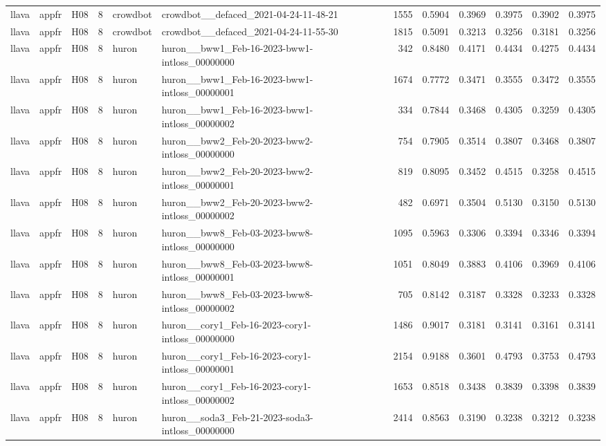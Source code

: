 \begin{table}[tbp]
\begin{tabular}{lllrllrrrrrr}
llava & appfr & H08 & 8 & crowdbot & crowdbot\_\_defaced\_2021-04-24-11-48-21 & 1555 & 0.5904 & 0.3969 & 0.3975 & 0.3902 & 0.3975 \\
llava & appfr & H08 & 8 & crowdbot & crowdbot\_\_defaced\_2021-04-24-11-55-30 & 1815 & 0.5091 & 0.3213 & 0.3256 & 0.3181 & 0.3256 \\
llava & appfr & H08 & 8 & huron & huron\_\_bww1\_Feb-16-2023-bww1-intloss\_00000000 & 342 & 0.8480 & 0.4171 & 0.4434 & 0.4275 & 0.4434 \\
llava & appfr & H08 & 8 & huron & huron\_\_bww1\_Feb-16-2023-bww1-intloss\_00000001 & 1674 & 0.7772 & 0.3471 & 0.3555 & 0.3472 & 0.3555 \\
llava & appfr & H08 & 8 & huron & huron\_\_bww1\_Feb-16-2023-bww1-intloss\_00000002 & 334 & 0.7844 & 0.3468 & 0.4305 & 0.3259 & 0.4305 \\
llava & appfr & H08 & 8 & huron & huron\_\_bww2\_Feb-20-2023-bww2-intloss\_00000000 & 754 & 0.7905 & 0.3514 & 0.3807 & 0.3468 & 0.3807 \\
llava & appfr & H08 & 8 & huron & huron\_\_bww2\_Feb-20-2023-bww2-intloss\_00000001 & 819 & 0.8095 & 0.3452 & 0.4515 & 0.3258 & 0.4515 \\
llava & appfr & H08 & 8 & huron & huron\_\_bww2\_Feb-20-2023-bww2-intloss\_00000002 & 482 & 0.6971 & 0.3504 & 0.5130 & 0.3150 & 0.5130 \\
llava & appfr & H08 & 8 & huron & huron\_\_bww8\_Feb-03-2023-bww8-intloss\_00000000 & 1095 & 0.5963 & 0.3306 & 0.3394 & 0.3346 & 0.3394 \\
llava & appfr & H08 & 8 & huron & huron\_\_bww8\_Feb-03-2023-bww8-intloss\_00000001 & 1051 & 0.8049 & 0.3883 & 0.4106 & 0.3969 & 0.4106 \\
llava & appfr & H08 & 8 & huron & huron\_\_bww8\_Feb-03-2023-bww8-intloss\_00000002 & 705 & 0.8142 & 0.3187 & 0.3328 & 0.3233 & 0.3328 \\
llava & appfr & H08 & 8 & huron & huron\_\_cory1\_Feb-16-2023-cory1-intloss\_00000000 & 1486 & 0.9017 & 0.3181 & 0.3141 & 0.3161 & 0.3141 \\
llava & appfr & H08 & 8 & huron & huron\_\_cory1\_Feb-16-2023-cory1-intloss\_00000001 & 2154 & 0.9188 & 0.3601 & 0.4793 & 0.3753 & 0.4793 \\
llava & appfr & H08 & 8 & huron & huron\_\_cory1\_Feb-16-2023-cory1-intloss\_00000002 & 1653 & 0.8518 & 0.3438 & 0.3839 & 0.3398 & 0.3839 \\
llava & appfr & H08 & 8 & huron & huron\_\_soda3\_Feb-21-2023-soda3-intloss\_00000000 & 2414 & 0.8563 & 0.3190 & 0.3238 & 0.3212 & 0.3238 \\

\end{tabular}
\end{table}
